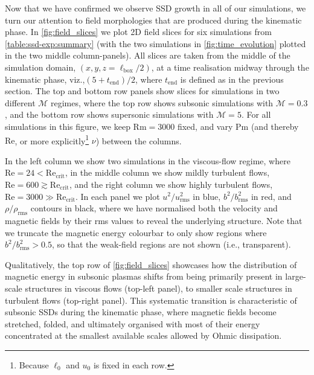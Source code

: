 \documentclass[12pt,twoside]{extreport}
\makeatletter
\newcommand{\mReh}{\ensuremath{\mathrm{Re}}} %
\newcommand{\mRem}{\ensuremath{\mathrm{Rm}}} %
\newcommand{\mPrm}{\ensuremath{\mathrm{Pm}}} %
\newcommand{\mSonicMach}{\ensuremath{\mathcal{M}}} %
\newcommand{\ie}{i.e.,\xspace} %
\newcommand{\viz}{viz.,\xspace} %
\providecommand{\DIFaddtex}[1]{{\protect\color{DIFgreen}\uwave{#1}}} %
\providecommand{\DIFdeltex}[1]{{\protect\color{DIFpurple}\sout{#1}}} %
\providecommand{\DIFaddbegin}{} %
\providecommand{\DIFaddend}{} %
\providecommand{\DIFdelbegin}{} %
\providecommand{\DIFdelend}{} %
\providecommand{\DIFadd}[1]{\texorpdfstring{\DIFaddtex{#1}}{#1}} %
\providecommand{\DIFdel}[1]{\texorpdfstring{\DIFdeltex{#1}}{}} %
\providecommand{\DIFscaledelfig}{0.5}
\newlength{\DIFdelgraphicswidth} %
\newlength{\DIFdelgraphicsheight} %
\providecommand{\DIFaddincludegraphics}[2][]{{\color{DIFgreen}\fbox{\DIFOincludegraphics[#1]{#2}}}} %
\providecommand{\DIFdelincludegraphics}[2][]{%
\sbox{\DIFdelgraphicsbox}{\DIFOincludegraphics[#1]{#2}}%
\settoboxwidth{\DIFdelgraphicswidth}{\DIFdelgraphicsbox} %
\settoboxtotalheight{\DIFdelgraphicsheight}{\DIFdelgraphicsbox} %
\scalebox{\DIFscaledelfig}{%
\parbox[b]{\DIFdelgraphicswidth}{\usebox{\DIFdelgraphicsbox}\\[-\baselineskip] \rule{\DIFdelgraphicswidth}{0em}}\llap{\resizebox{\DIFdelgraphicswidth}{\DIFdelgraphicsheight}{%
\setlength{\unitlength}{\DIFdelgraphicswidth}%
\begin{picture}(1,1)%
\thicklines\linethickness{2pt} %
{\color{DIFpurple}\put(0,0){\framebox(1,1){}}}%
{\color{DIFpurple}\put(0,0){\line( 1,1){1}}}%
{\color{DIFpurple}\put(0,1){\line(1,-1){1}}}%
\end{picture}%
}\hspace*{3pt}}} %
} %
\DeclareRobustCommand{\DIFaddbegin}{\DIFOaddbegin \let\includegraphics\DIFaddincludegraphics} %
\DeclareRobustCommand{\DIFaddend}{\DIFOaddend \let\includegraphics\DIFOincludegraphics} %
\DeclareRobustCommand{\DIFdelbegin}{\DIFOdelbegin \let\includegraphics\DIFdelincludegraphics} %
\DeclareRobustCommand{\DIFdelend}{\DIFOaddend \let\includegraphics\DIFOincludegraphics} %
\let\sout@orig\sout %
\renewcommand{\sout}[1]{\ifmmode\text{\sout@orig{\ensuremath{#1}}}\else\sout@orig{#1}\fi} %
\makeatother
\begin{document}
Now that we have confirmed we observe SSD growth in all of our simulations, we turn our attention to field morphologies that are produced during the kinematic phase. In \autoref{fig:field_slices} we plot 2D field slices for six simulations from \autoref{table:ssd-exp:summary} (with the two simulations in \autoref{fig:time_evolution} plotted in the two middle column-panels). All slices are taken from the middle of the simulation domain, $(x, y, z=\ell_\mathrm{box}/2)$, at a time realisation midway through the kinematic phase, \viz $(5 + t_\mathrm{end})/2$, where $t_\mathrm{end}$ is defined as in the previous section. The top and bottom row panels show slices for simulations in two different $\mSonicMach$ regimes, where the top row shows subsonic simulations with $\mSonicMach = 0.3$, and the bottom row shows supersonic simulations with $\mSonicMach = 5$. For all simulations in this figure, we keep \mbox{$\mRem = 3000$} fixed, and vary $\mPrm$ (and thereby $\mReh$, or more explicitly\footnote{
    Because \DIFdelbegin \DIFdel{$\ell_0$ }\DIFdelend \DIFaddbegin \DIFadd{$\ell_\mathrm{turb}$ }\DIFaddend and \DIFdelbegin \DIFdel{$u_0$ }\DIFdelend \DIFaddbegin \DIFadd{$u_\mathrm{turb}$ }\DIFaddend is fixed in each row.
} $\nu$) between the columns.

In the left column we show two simulations in the viscous-flow regime, where $\mReh = 24 < \mReh_\mathrm{crit}$, in the middle column we show mildly turbulent flows, $\mReh = 600 \gtrsim \mReh_\mathrm{crit}$, and the right column we show highly turbulent flows, $\mReh = 3000 \gg \mReh_\mathrm{crit}$. In each panel we plot $u^2 / u_\mathrm{rms}^2$ in blue, $b^2/b_\mathrm{rms}^2$ in red, and $\rho/\rho_\mathrm{rms}$ contours in black, where we have normalised both the velocity and magnetic fields by their rms values to reveal the underlying structure. Note that we truncate the magnetic energy colourbar to only show regions where $b^2/b_\mathrm{rms}^2 > 0.5$, so that the weak-field regions are not shown (\ie transparent).

Qualitatively, the top row of \autoref{fig:field_slices} showcases how the distribution of magnetic energy in subsonic plasmas shifts from being primarily present in large-scale structures in viscous flows (top-left panel), to smaller scale structures in turbulent flows (top-right panel). This systematic transition is characteristic of subsonic SSDs during the kinematic phase, where magnetic fields become stretched, folded, and ultimately organised with most of their energy concentrated at the smallest available scales allowed by Ohmic dissipation.
\end{document}
